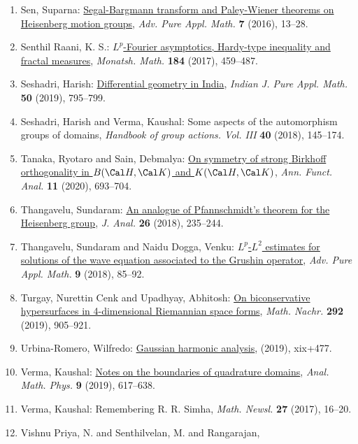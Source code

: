 \begin{enumerate}
\item Sen, Suparna: \href{https://doi.org/10.1515/apam-2015-0010}{Segal-{B}argmann transform and {P}aley-{W}iener theorems on
{H}eisenberg motion groups}, \emph{Adv. Pure Appl. Math.} {\bf 7} (2016), 13--28.
\item Senthil Raani, K. S.: \href{https://doi.org/10.1007/s00605-017-1081-7}{{$L^p$}-{F}ourier asymptotics, {H}ardy-type inequality and
fractal measures}, \emph{Monatsh. Math.} {\bf 184} (2017), 459--487.
\item Seshadri, Harish: \href{https://doi.org/10.1007/s13226-019-0355-2}{Differential geometry in {I}ndia}, \emph{Indian J. Pure Appl. Math.} {\bf 50} (2019), 795--799.
\item Seshadri, Harish and Verma, Kaushal: Some aspects of the automorphism groups of domains, \emph{Handbook of group actions. {V}ol. {III}} {\bf 40} (2018), 145--174.
\item Tanaka, Ryotaro and Sain, Debmalya: \href{https://doi.org/10.1007/s43034-019-00048-7}{On symmetry of strong {B}irkhoff orthogonality in {$B(\Cal
H,\Cal K)$} and {$K(\Cal H,\Cal K)$}}, \emph{Ann. Funct. Anal.} {\bf 11} (2020), 693--704.
\item Thangavelu, Sundaram: \href{https://doi.org/10.1007/s41478-018-0147-9}{An analogue of {P}fannschmidt's theorem for the {H}eisenberg
group}, \emph{J. Anal.} {\bf 26} (2018), 235--244.
\item Thangavelu, Sundaram and Naidu Dogga, Venku: \href{https://doi.org/10.1515/apam-2017-0042}{{$L^p$}-{$L^2$} estimates for solutions of the wave equation
associated to the {G}rushin operator}, \emph{Adv. Pure Appl. Math.} {\bf 9} (2018), 85--92.
\item Turgay, Nurettin Cenk and Upadhyay, Abhitosh: \href{https://doi.org/10.1002/mana.201700328}{On biconservative hypersurfaces in 4-dimensional {R}iemannian
space forms}, \emph{Math. Nachr.} {\bf 292} (2019), 905--921.
\item Urbina-Romero, Wilfredo: \href{https://doi.org/10.1007/978-3-030-05597-4}{Gaussian harmonic analysis}, \emph{} {\bf } (2019), xix+477.
\item Verma, Kaushal: \href{https://doi.org/10.1007/s13324-018-0221-0}{Notes on the boundaries of quadrature domains}, \emph{Anal. Math. Phys.} {\bf 9} (2019), 617--638.
\item Verma, Kaushal: Remembering {R}. {R}. {S}imha, \emph{Math. Newsl.} {\bf 27} (2017), 16--20.
\item Vishnu Priya, N. and Senthilvelan, M. and Rangarajan,

\end{enumerate}
